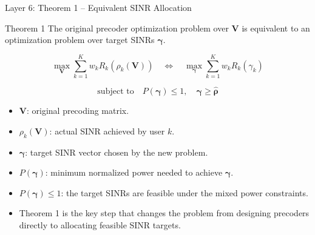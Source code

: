 \documentclass{beamer}
\begin{document}
\begin{frame}{Layer 6: Theorem 1 -- Equivalent SINR Allocation}
\scriptsize

\begin{block}{Theorem 1}
The original precoder optimization problem over \(\mathbf{V}\) is equivalent to an optimization problem over target SINRs \(\boldsymbol{\gamma}\).
\end{block}

\[
\max_{\mathbf{V}}
\sum_{k=1}^{K}w_kR_k(\rho_k(\mathbf{V}))
\quad
\Longleftrightarrow
\quad
\max_{\boldsymbol{\gamma}}
\sum_{k=1}^{K}w_kR_k(\gamma_k)
\]

\[
\text{subject to}
\quad
P(\boldsymbol{\gamma})\le 1,
\quad
\boldsymbol{\gamma}\ge \widehat{\boldsymbol{\rho}}
\]

\begin{itemize}
    \item \(\mathbf{V}\): original precoding matrix.
    \item \(\rho_k(\mathbf{V})\): actual SINR achieved by user \(k\).
    \item \(\boldsymbol{\gamma}\): target SINR vector chosen by the new problem.
    \item \(P(\boldsymbol{\gamma})\): minimum normalized power needed to achieve \(\boldsymbol{\gamma}\).
    \item \(P(\boldsymbol{\gamma})\le 1\): the target SINRs are feasible under the mixed power constraints.
    \item Theorem 1 is the key step that changes the problem from designing precoders directly to allocating feasible SINR targets.
\end{itemize}

\end{frame}
\end{document}
